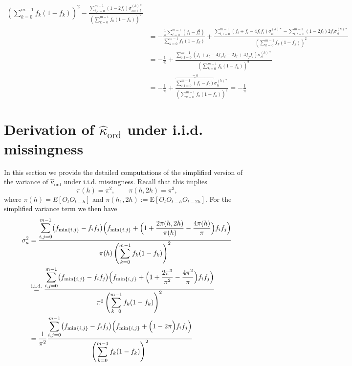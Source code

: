 ﻿\documentclass[12pt,a4paper]{scrreprt}
\theoremstyle{definition}
\begin{document}
\begin{appendices}
\begin{align*}
             {\left(\sum_{k=0}^{m-1}f_k(1-f_k)\right)^2} 
        - \frac{\sum_{i,l=0}^{m-1}(1-2f_i)\sigma_{im+l}^{(h)*}}{\left(\sum_{k=0}^{m-1}f_k(1-f_k)\right)^2} \\
    &= -\frac{\frac{1}{\pi}\sum_{i=0}^{m-1}(f_i- f_i^2)}{\sum_{k=0}^{m-1}f_k(1-f_k)} +  \frac{\sum_{i,l = 0}^{m-1}(f_i + f_l - 4f_i f_l)\sigma_{li}^{(h)*}- \sum_{i,l=0}^{m-1}(1-2f_i)2f_l\sigma^{(h)*}_{li}}{\left(\sum_{k=0}^{m-1}f_k(1-f_k)\right)^2} \\
    &= -\frac{1}{\pi} + \frac{\sum_{i,l = 0}^{m-1}\left(f_i + f_l - 4f_i f_l - 2f_l+ 4 f_j f_l \right)\sigma^{(h)*}_{li}}{\left(\sum_{k=0}^{m-1}f_k(1-f_k)\right)^2} \\
    &= -\frac{1}{\pi} + \frac{\overbrace{\sum_{i,l = 0}^{m-1}\left(f_i - f_l \right)}^{=0}\sigma^{(h)*}_{li}}{\left(\sum_{k=0}^{m-1}f_k(1-f_k)\right)^2} 
    = -\frac{1}{\pi}\end{align*}


\section{Derivation of $\hat{\kappa}_{\mathrm{ord}}$ under i.i.d. missingness}\label{app:var-kappa-iid}
In this section we provide the detailed computations of the simplified version of the variance of $\hat{\kappa}_{\mathrm{ord}}$ under i.i.d. missingness. Recall that this implies
\[
    \pi(h) = \pi^2, \qquad \pi(h, 2h) = \pi^3,
\]
where $\pi(h) = E[O_t O_{t-h}]$ and $\pi(h_1,2h) := \mathrm{E}[O_t O_{t-h}O_{t-2h}]$.
For the simplified variance term we then have
\begin{align*}
    \sigma^2_\kappa &=
        \frac{
            \displaystyle\sum_{i,j=0}^{m-1}
            \bigl(f_{\min\{i,j\}}-f_if_j\bigr)
            \Bigl(f_{\min\{i,j\}} 
            + \Bigl(1+\frac{2\pi(h,2h)}{\pi(h)} 
            - \frac{4\pi(h)}{\pi}\Bigr)f_if_j\Bigr)
        }{
            \pi(h)\left(\displaystyle\sum_{k=0}^{m-1}f_k(1-f_k)\right)^2
        }  \\
    &\overset{\mathrm{i.i.d.}}{=}
        \frac{
            \displaystyle\sum_{i,j=0}^{m-1}
            \bigl(f_{\min\{i,j\}}-f_if_j\bigr)
            \Bigl(f_{\min\{i,j\}} 
            + \Bigl(1+\frac{2\pi^3}{\pi^2} 
            - \frac{4\pi^2}{\pi}\Bigr)f_if_j\Bigr)
        }{\pi^2
            \left(\displaystyle\sum_{k=0}^{m-1}f_k(1-f_k)\right)^2
        }\\
    &=\frac{1}{\pi^2}
        \frac{
            \displaystyle\sum_{i,j=0}^{m-1}
            \bigl(f_{\min\{i,j\}}-f_if_j\bigr)
            \Bigl(f_{\min\{i,j\}} 
            + \Bigl(1-2\pi\Bigr)f_i f_j\Bigr)
        }{
            \left(\displaystyle\sum_{k=0}^{m-1}f_k(1-f_k)\right)^2
        }\\
\end{align*}


\end{appendices}
\end{document}

